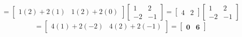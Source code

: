 \documentclass[11pt,letterpaper]{article}
\begin{document}
\begin{enumerate}
    $$= \begin{bmatrix} 1(2)+2(1) & 1(2)+2(0) \end{bmatrix} \begin{bmatrix} 1 & 2 \\ -2 & -1 \end{bmatrix} = \begin{bmatrix} 4 & 2 \end{bmatrix} \begin{bmatrix} 1 & 2 \\ -2 & -1 \end{bmatrix}$$
    $$= \begin{bmatrix} 4(1)+2(-2) & 4(2)+2(-1) \end{bmatrix} = \mathbf{\begin{bmatrix} 0 & 6 \end{bmatrix}}$$
\end{enumerate}
\end{document}
